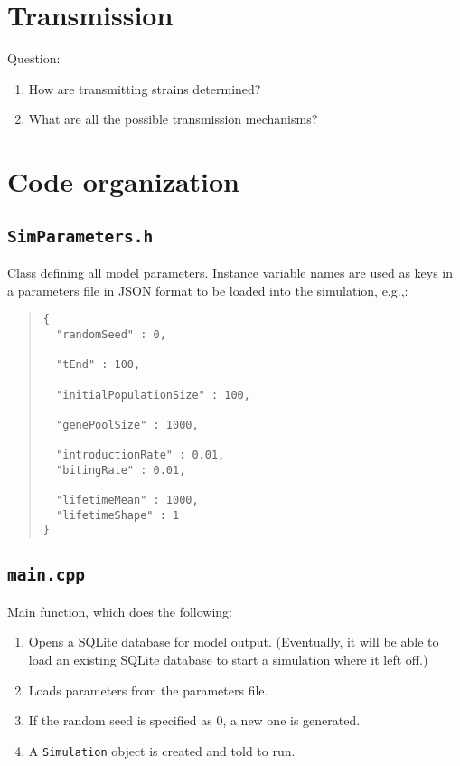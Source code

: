 \documentclass[11pt]{article}
\begin{document}
\section{Transmission}

Question:
\begin{enumerate}
	\item How are transmitting strains determined?
	\item What are all the possible transmission mechanisms?
\end{enumerate}


\section{Code organization}

\subsection{\texttt{SimParameters.h}}

Class defining all model parameters. Instance variable names are used as keys in a parameters file in JSON format to be loaded into the simulation, e.g.,:

\begin{quote}
\begin{verbatim}
{
  "randomSeed" : 0,
  
  "tEnd" : 100,
  
  "initialPopulationSize" : 100,
  
  "genePoolSize" : 1000,
  
  "introductionRate" : 0.01,
  "bitingRate" : 0.01,
  
  "lifetimeMean" : 1000,
  "lifetimeShape" : 1
}
\end{verbatim}
\end{quote}

\subsection{\texttt{main.cpp}}

Main function, which does the following:
\begin{enumerate}
	\item Opens a SQLite database for model output. (Eventually, it will be able to load an existing SQLite database to start a simulation where it left off.)
	\item Loads parameters from the parameters file.
	\item If the random seed is specified as 0, a new one is generated.
	\item A \texttt{Simulation} object is created and told to run.
\end{enumerate}
\end{document}
